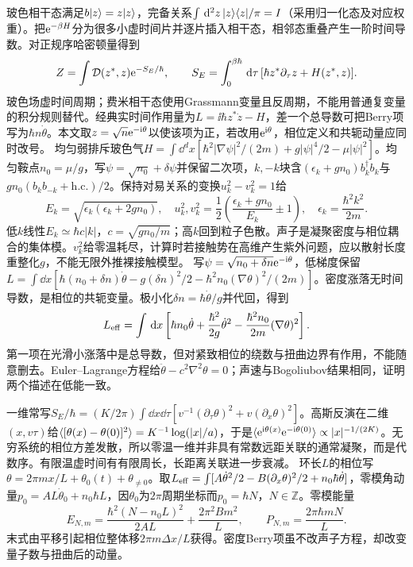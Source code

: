 \label{ch:boson}
玻色相干态满足$b\lvert z\rangle=z\lvert z\rangle$，完备关系$\int\,\mathrm d^2z\,\lvert z\rangle\langle z\rvert/\pi=I$（采用归一化态及对应权重）。把$\mathrm e^{-\beta H}$分为很多小虚时间片并逐片插入相干态，相邻态重叠产生一阶时间导数。对正规序哈密顿量得到
\begin{equation}
Z=\int\mathcal D(z^*,z)\mathrm e^{-S_E/\hbar},\qquad S_E=\int_0^{\beta\hbar}\,\mathrm d\tau\,[\hbar z^*\partial_\tau z+H(z^*,z)].
\end{equation}
玻色场虚时间周期；费米相干态使用Grassmann变量且反周期，不能用普通复变量的积分规则替代。经典实时间作用量为$L=\ii\hbar z^*\dot z-H$，差一个总导数可把Berry项写为$\hbar n\dot\theta$。本文取$z=\sqrt n\mathrm e^{-\mathrm i\theta}$以使该项为正，若改用$\mathrm e^{\mathrm i\theta}$，相位定义和共轭动量应同时改号。
均匀弱排斥玻色气$H=\int\dd^dx[\hbar^2|\nabla\psi|^2/(2m)+g|\psi|^4/2-\mu|\psi|^2]$。均匀鞍点$n_0=\mu/g$，写$\psi=\sqrt{n_0}+\delta\psi$并保留二次项，$k,-k$块含$(\epsilon_k+gn_0)b_k^\dagger b_k$与$gn_0(b_kb_{-k}+\mathrm{h.c.})/2$。保持对易关系的变换$u_k^2-v_k^2=1$给
\begin{equation}
E_k=\sqrt{\epsilon_k(\epsilon_k+2gn_0)},\quad u_k^2,v_k^2=\frac12\left(\frac{\epsilon_k+gn_0}{E_k}\pm1\right),\quad\epsilon_k=\frac{\hbar^2k^2}{2m}.
\end{equation}
低$k$线性$E_k\simeq\hbar c|k|$，$c=\sqrt{gn_0/m}$；高$k$回到粒子色散。声子是凝聚密度与相位耦合的集体模。$v_k^2$给零温耗尽，计算时若接触势在高维产生紫外问题，应以散射长度重整化$g$，不能无限外推裸接触模型。
写$\psi=\sqrt{n_0+\delta n}\mathrm e^{-\mathrm i\theta}$，低梯度保留$L=\int\dd x[\hbar(n_0+\delta n)\dot\theta-g(\delta n)^2/2-\hbar^2n_0(\nabla\theta)^2/(2m)]$。密度涨落无时间导数，是相位的共轭变量。极小化$\delta n=\hbar\dot\theta/g$并代回，得到
\begin{equation}
L_{\rm eff}=\int\,\mathrm d x\left[\hbar n_0\dot\theta+\frac{\hbar^2}{2g}\dot\theta^2-\frac{\hbar^2n_0}{2m}(\nabla\theta)^2\right].
\end{equation}
第一项在光滑小涨落中是总导数，但对紧致相位的绕数与扭曲边界有作用，不能随意删去。Euler--Lagrange方程给$\ddot\theta-c^2\nabla^2\theta=0$；声速与Bogoliubov结果相同，证明两个描述在低能一致。

一维常写$S_E/\hbar=(K/2\pi)\int\dd x\dd\tau[v^{-1}(\partial_\tau\theta)^2+v(\partial_x\theta)^2]$。高斯反演在二维$(x,v\tau)$给$\langle [\theta(x)-\theta(0)]^2\rangle=K^{-1}\log(|x|/a)$，于是$\langle \mathrm e^{\mathrm i\theta(x)}\mathrm e^{-\mathrm i\theta(0)}\rangle\propto|x|^{-1/(2K)}$。无穷系统的相位方差发散，所以零温一维并非具有常数远距关联的通常凝聚，而是代数序。有限温虚时间有有限周长，长距离关联进一步衰减。
环长$L$的相位写$\theta=2\pi mx/L+\theta_0(t)+\theta_{\ne0}$。取$L_{\rm eff}=\int[A\dot\theta^2/2-B(\partial_x\theta)^2/2+n_0\hbar\dot\theta]$，零模角动量$p_0=AL\dot\theta_0+n_0\hbar L$，因$\theta_0$为$2\pi$周期坐标而$p_0=\hbar N$，$N\in\mathbb Z$。零模能量
\begin{equation}
E_{N,m}=\frac{\hbar^2(N-n_0L)^2}{2AL}+\frac{2\pi^2Bm^2}{L},\qquad P_{N,m}=\frac{2\pi\hbar mN}{L}.
\end{equation}
末式由平移引起相位整体移$2\pi m\Delta x/L$获得。密度Berry项虽不改声子方程，却改变量子数与扭曲后的动量。

